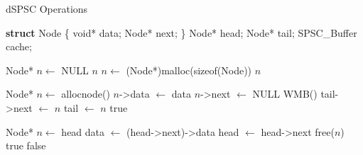 \begin{algorithm}[!ht]
    \centering
    \captionsetup{justification=centering}
    \caption{\ac{dSPSC} Operations \cite{torquati2010singleproducersingleconsumerqueuessharedcache}}
    \label{alg:dspsc-detailed}
    \scriptsize
    \begin{algorithmic}[1]
        \State \textbf{struct} Node \{ void* data; Node* next; \}
        \State Node* head; 
        \State Node* tail; 
        \State SPSC\_Buffer cache; 
        
        \State
        
            \State Node* $n \gets$ NULL
             
                \State \Return $n$
            \EndIf
            \State $n \gets$ (Node*)malloc(sizeof(Node))
            \State \Return $n$
        \EndFunction
        
        \State
        
            \State Node* $n \gets$ allocnode() 
            \State $n$->data $\gets$ data
            \State $n$->next $\gets$ NULL
            \State WMB() 
            \State tail->next $\gets$ $n$ 
            \State tail $\gets$ $n$ 
            \State \Return true
        \EndFunction
        
        \State
        
             
                \State Node* $n \gets$ head 
                \State *data $\gets$ (head->next)->data 
                \State head $\gets$ head->next 
                 
                    \State free($n$) 
                \EndIf
                \State \Return true
            \EndIf
            \State \Return false 
        \EndFunction
    \end{algorithmic}
\end{algorithm}

